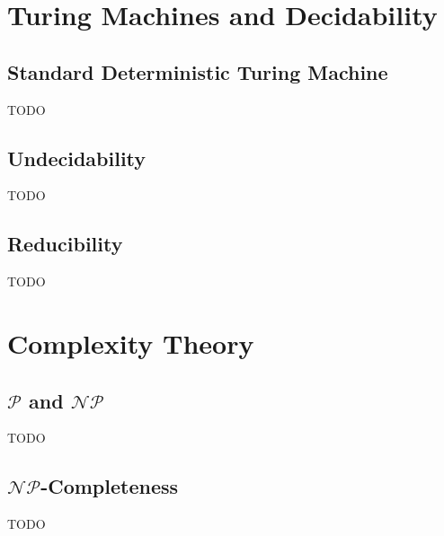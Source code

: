 \documentclass{article}
\theoremstyle{definition}
\begin{document}
\section{Turing Machines and Decidability}

\subsection{Standard Deterministic Turing Machine}
TODO

\subsection{Undecidability}
TODO

\subsection{Reducibility}
TODO

\section{Complexity Theory}

\subsection{$\mathcal{P}$ and $\mathcal{NP}$}
TODO

\subsection{$\mathcal{NP}$-Completeness}
TODO
\end{document}
